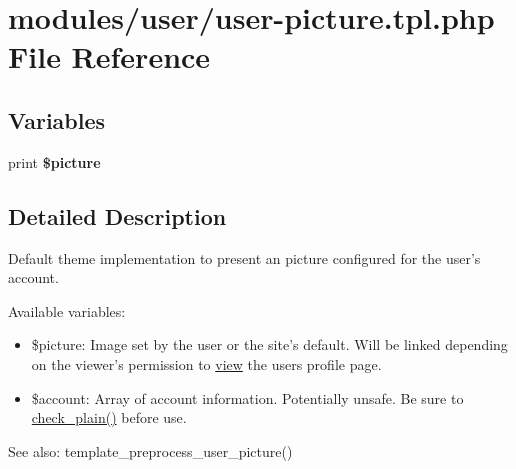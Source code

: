 \hypertarget{user-picture_8tpl_8php}{
\section{modules/user/user-picture.tpl.php File Reference}
\label{user-picture_8tpl_8php}
}
\subsection*{Variables}
\begin{CompactItemize}
\item 
\hypertarget{user-picture_8tpl_8php_bb12f8c31dba99f68efccffe9434082c}{
print \textbf{\$picture}}
\label{user-picture_8tpl_8php_bb12f8c31dba99f68efccffe9434082c}

\end{CompactItemize}


\subsection{Detailed Description}
Default theme implementation to present an picture configured for the user's account.

Available variables:\begin{itemize}
\item \$picture: Image set by the user or the site's default. Will be linked depending on the viewer's permission to \hyperlink{classview}{view} the users profile page.\item \$account: Array of account information. Potentially unsafe. Be sure to \hyperlink{bootstrap_8inc_76fc67a30fd8d75ddd80565e6e65a13d}{check\_\-plain()} before use.\end{itemize}


\begin{Desc}
\item[See also:]template\_\-preprocess\_\-user\_\-picture() \end{Desc}
